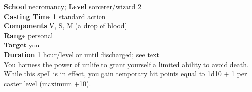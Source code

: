 \textbf{School} necromancy; \textbf{Level} sorcerer/wizard 2\\
\textbf{Casting Time} 1 standard action\\
\textbf{Components} V, S, M (a drop of blood)\\
\textbf{Range} personal\\
\textbf{Target} you\\
\textbf{Duration} 1 hour/level or until discharged; see text\\
You harness the power of unlife to grant yourself a limited ability to avoid death. While this spell is in effect, you gain temporary hit points equal to 1d10 + 1 per caster level (maximum +10).\\
